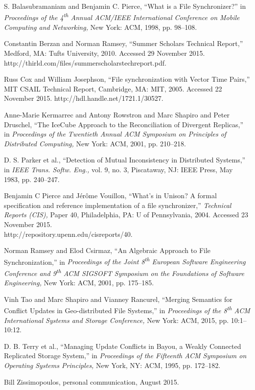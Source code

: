 
S. Balasubramaniam and Benjamin C. Pierce,
``What is a File Synchronizer?''
in \emph{Proceedings of the 4\textsuperscript{th} Annual 
ACM/IEEE International Conference on Mobile Computing and Networking,}
New York: ACM, 1998, pp. 98--108.

Constantin Berzan and Norman Ramsey,
``Summer Scholars Technical Report,''
Medford, MA: Tufts University, 2010.
Accessed 29 November 2015.
http://thirld.com/files/summerscholars\undersc techreport.pdf.

Russ Cox and William Josephson,
``File synchronization with Vector Time Pairs,''
MIT CSAIL Technical Report,
Cambridge, MA: MIT,
2005.
Accessed 22 November 2015.
http://hdl.handle.net/1721.1/30527.

Anne-Marie Kermarrec and Antony Rowstron and Marc Shapiro and Peter Druschel,
``The IceCube Approach to the Reconciliation of Divergent Replicas,''
in \emph{Proceedings of the Twentieth Annual ACM Symposium on Principles of Distributed Computing,}
New York: ACM, 2001, pp. 210--218.

D. S. Parker et al.,
``Detection of Mutual Inconsistency in Distributed Systems,''
in \emph{IEEE Trans. Softw. Eng.,}
vol. 9, no. 3,
Piscataway, NJ: IEEE Press,
May 1983,
pp. 240--247.

Benjamin C Pierce and J{\'e}r{\^o}me Vouillon,
``What's in Unison? A formal specification and reference implementation of a file synchronizer,''
\emph{Technical Reports (CIS),}
Paper 40,
Philadelphia, PA: U of Pennsylvania,
2004.
Accessed 23 November 2015.\\
http://repository.upenn.edu/cis\undersc reports/40.

Norman Ramsey and Elod Csirmaz,
``An Algebraic Approach to File Synchronization,''
in \emph{Proceedings of the Joint 8\textsuperscript{th} European Software Engineering Conference 
and 9\textsuperscript{th} ACM SIGSOFT Symposium on the Foundations of Software Engineering,}
New York: ACM, 2001, pp. 175--185.

Vinh Tao and Marc Shapiro and Vianney Rancurel,
``Merging Semantics for Conflict Updates in Geo-distributed File Systems,''
in \emph{Proceedings of the 8\textsuperscript{th}
 ACM International Systems and Storage Conference,}
New York: ACM, 2015, pp. 10:1--10:12.

D. B. Terry et al.,
``Managing Update Conflicts in Bayou, a Weakly Connected Replicated Storage System,''
in \emph{Proceedings of the Fifteenth ACM Symposium on Operating Systems Principles,}
New York, NY: ACM, 1995, pp. 172--182.

Bill Zissimopoulos, personal communication, August 2015.
